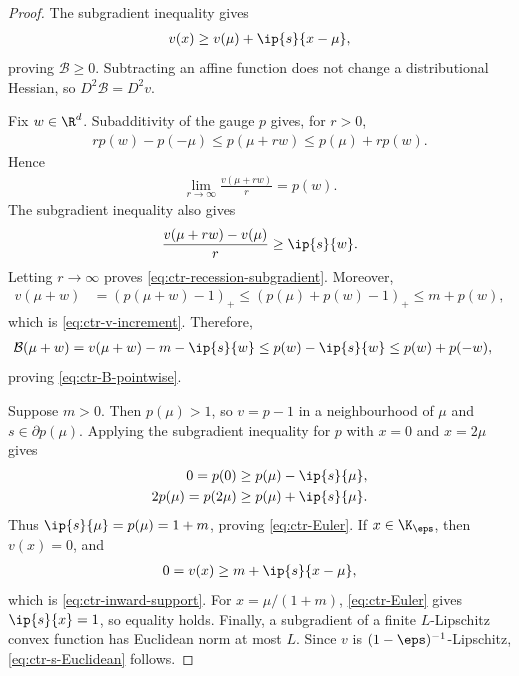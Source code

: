 \begin{proof}
    The subgradient inequality gives
    \begin{align}
        v(x)\geq v(\mu)+\ip{s}{x-\mu},
    \end{align}
    proving $\mathcal B\geq0$.  Subtracting an affine function does not change
    a distributional Hessian, so $D^2\mathcal B=D^2v$.

    Fix $w\in\R^d$.  Subadditivity of the gauge $p$ gives, for $r>0$,
    \begin{align}
        rp(w)-p(-\mu)
        \leq p(\mu+rw)
        \leq p(\mu)+rp(w).
    \end{align}
    Hence
    \begin{align}
        \lim_{r\to\infty}\frac{v(\mu+rw)}r=p(w).
    \end{align}
    The subgradient inequality also gives
    \begin{align}
        \frac{v(\mu+rw)-v(\mu)}r\geq\ip{s}{w}.
    \end{align}
    Letting $r\to\infty$ proves
    \eqref{eq:ctr-recession-subgradient}.  Moreover,
    \begin{align}
        v(\mu+w)
         & =(p(\mu+w)-1)_+
        \leq(p(\mu)+p(w)-1)_+
        \leq m+p(w),
    \end{align}
    which is \eqref{eq:ctr-v-increment}.  Therefore,
    \begin{align}
        \mathcal B(\mu+w)
         & =v(\mu+w)-m-\ip{s}{w}
        \leq p(w)-\ip{s}{w}
        \leq p(w)+p(-w),
    \end{align}
    proving \eqref{eq:ctr-B-pointwise}.

    Suppose $m>0$.  Then $p(\mu)>1$, so $v=p-1$ in a neighbourhood of
    $\mu$ and $s\in\partial p(\mu)$.  Applying the subgradient inequality for
    $p$ with $x=0$ and $x=2\mu$ gives
    \begin{align}
        0=p(0)          & \geq p(\mu)-\ip{s}{\mu},
        \\
        2p(\mu)=p(2\mu) & \geq p(\mu)+\ip{s}{\mu}.
    \end{align}
    Thus $\ip{s}{\mu}=p(\mu)=1+m$, proving \eqref{eq:ctr-Euler}.  If
    $x\in\K_\eps$, then $v(x)=0$, and
    \begin{align}
        0=v(x)\geq m+\ip{s}{x-\mu},
    \end{align}
    which is \eqref{eq:ctr-inward-support}.  For
    $x=\mu/(1+m)$, \eqref{eq:ctr-Euler} gives $\ip{s}{x}=1$, so equality
    holds.  Finally, a subgradient of a finite $L$-Lipschitz convex function
    has Euclidean norm at most $L$.  Since $v$ is
    $(1-\eps)^{-1}$-Lipschitz, \eqref{eq:ctr-s-Euclidean} follows.
\end{proof}

